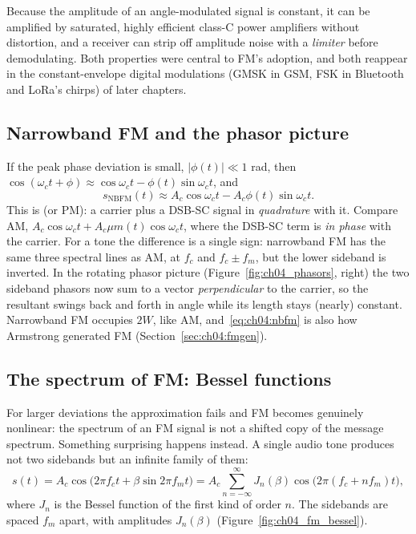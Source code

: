 
Because the amplitude of an angle-modulated signal is constant, it can be amplified by saturated, highly
efficient class-C power amplifiers without distortion, and a receiver can strip off amplitude noise with
a \emph{limiter} before demodulating. Both properties were central to FM's adoption, and both reappear in
the constant-envelope digital modulations (GMSK in GSM, FSK in Bluetooth and LoRa's chirps) of later
chapters.

\subsection{Narrowband FM and the phasor picture}
\label{sec:ch04:nbfm}

If the peak phase deviation is small, $|\phi(t)|\ll1$ rad, then
$\cos(\omega_ct+\phi)\approx\cos\omega_ct-\phi(t)\sin\omega_ct$, and
\begin{equation}
s_{\text{NBFM}}(t)\approx A_c\cos\omega_ct-A_c\phi(t)\sin\omega_ct.
\label{eq:ch04:nbfm}
\end{equation}
This is  (or PM): a carrier plus a DSB-SC signal in \emph{quadrature} with it. Compare
AM, $A_c\cos\omega_ct+A_c\mu m(t)\cos\omega_ct$, where the DSB-SC term is \emph{in phase} with the carrier.
For a tone the difference is a single sign: narrowband FM has the same three spectral lines as AM, at
$f_c$ and $f_c\pm f_m$, but the lower sideband is inverted. In the rotating phasor picture
(Figure~\ref{fig:ch04_phasors}, right) the two sideband phasors now sum to a vector \emph{perpendicular}
to the carrier, so the resultant swings back and forth in angle while its length stays (nearly) constant.
Narrowband FM occupies $2W$, like AM, and~\eqref{eq:ch04:nbfm} is also how Armstrong generated FM
(Section~\ref{sec:ch04:fmgen}).

\subsection{The spectrum of FM: Bessel functions}

For larger deviations the approximation fails and FM becomes genuinely nonlinear: the spectrum of an FM
signal is not a shifted copy of the message spectrum. Something surprising happens instead. A single
audio tone produces not two sidebands but an infinite family of them:
\begin{equation}
s(t)=A_c\cos\big(2\pi f_c t+\beta\sin 2\pi f_m t\big)=A_c\sum_{n=-\infty}^{\infty}J_n(\beta)\cos\big(2\pi(f_c+nf_m)t\big),
\label{eq:ch04:bessel}
\end{equation}
where $J_n$ is the Bessel function of the first kind of order $n$. The sidebands are spaced $f_m$ apart,
with amplitudes $J_n(\beta)$ (Figure~\ref{fig:ch04_fm_bessel}).

